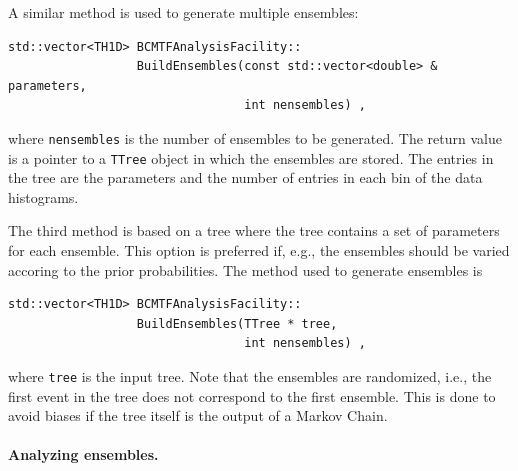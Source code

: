 \documentclass[11pt, a4paper]{article}
\begin{document}
A similar method is used to generate multiple ensembles:
%
\begin{verbatim}
std::vector<TH1D> BCMTFAnalysisFacility::
                  BuildEnsembles(const std::vector<double> & parameters,
                                 int nensembles) ,
\end{verbatim}
%
where \verb|nensembles| is the number of ensembles to be
generated. The return value is a pointer to a \verb|TTree| object in
which the ensembles are stored. The entries in the tree are the
parameters and the number of entries in each bin of the data
histograms.

The third method is based on a tree where the tree contains a set of
parameters for each ensemble. This option is preferred if, e.g., the
ensembles should be varied accoring to the prior probabilities. The
method used to generate ensembles is
%
\begin{verbatim}
std::vector<TH1D> BCMTFAnalysisFacility::
                  BuildEnsembles(TTree * tree,
                                 int nensembles) ,
\end{verbatim}
%
where \verb|tree| is the input tree. Note that the ensembles are
randomized, i.e., the first event in the tree does not correspond to
the first ensemble. This is done to avoid biases if the tree itself is
the output of a Markov Chain.

\paragraph{Analyzing ensembles.}
\end{document}
